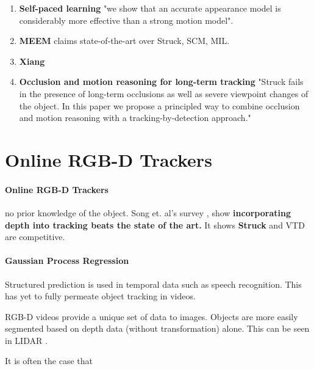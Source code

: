 \begin{enumerate}
\item \textbf{Self-paced learning} \cite{supancic2013self} "we show that an accurate appearance model is considerably more effective than a strong motion model". 
\item \textbf{MEEM} \cite{zhang2014meem} claims state-of-the-art over Struck, SCM, MIL.
\item \textbf{Xiang} \cite{xiang2014monocular}
\item \textbf{Occlusion and motion reasoning for long-term tracking} \cite{hua2014occlusion} "Struck fails in
the presence of long-term occlusions as well as severe viewpoint changes
of the object. In this paper we propose a principled way to combine occlusion and motion reasoning with a tracking-by-detection approach."
\end{enumerate}

\section{Online RGB-D Trackers}
\label{sec:relatedwork}
\paragraph{Online RGB-D Trackers} no prior knowledge of the object.
Song et. al's survey \cite{song2013tracking}, show \textbf{incorporating depth into tracking beats the state of the art.} It shows \textbf{Struck} \cite{hare2011struck} and VTD are competitive.

\paragraph{Gaussian Process Regression} \cite{gao2014transfer} 

Structured prediction is used in temporal data such as speech recognition. This
has yet to fully permeate object tracking in videos.

RGB-D videos provide a unique set of data to images. Objects are more easily
segmented based on depth data (without transformation) alone. This can be seen
in LIDAR \cite{morton2013multi}.

It is often the case that 
